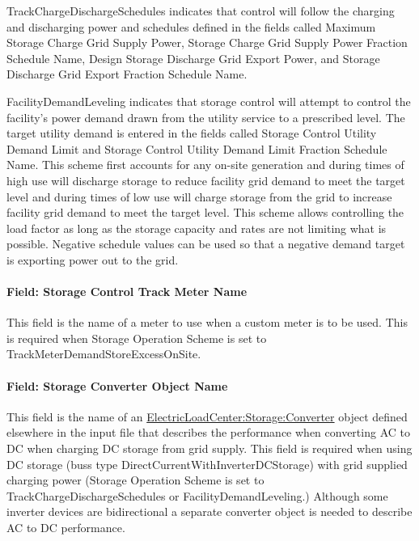 TrackChargeDischargeSchedules indicates that control will follow the charging and discharging power and schedules defined in the fields called Maximum Storage Charge Grid Supply Power, Storage Charge Grid Supply Power Fraction Schedule Name, Design Storage Discharge Grid Export Power, and Storage Discharge Grid Export Fraction Schedule Name.

FacilityDemandLeveling indicates that storage control will attempt to control the facility's power demand drawn from the utility service to a prescribed level. The target utility demand is entered in the fields called Storage Control Utility Demand Limit and Storage Control Utility Demand Limit Fraction Schedule Name. This scheme first accounts for any on-site generation and during times of high use will discharge storage to reduce facility grid demand to meet the target level and during times of low use will charge storage from the grid to increase facility grid demand to meet the target level. This scheme allows controlling the load factor as long as the storage capacity and rates are not limiting what is possible. Negative schedule values can be used so that a negative demand target is exporting power out to the grid.

\paragraph{Field: Storage Control Track Meter Name}\label{field-storage-control-track-meter-name}

This field is the name of a meter to use when a custom meter is to be used. This is required when Storage Operation Scheme is set to TrackMeterDemandStoreExcessOnSite.

\paragraph{Field: Storage Converter Object Name}\label{field-storage-converter-object-name}

This field is the name of an \hyperref[electricloadcenterstorageconverter]{ElectricLoadCenter:Storage:Converter} object defined elsewhere in the input file that describes the performance when converting AC to DC when charging DC storage from grid supply. This field is required when using DC storage (buss type DirectCurrentWithInverterDCStorage) with grid supplied charging power (Storage Operation Scheme is set to TrackChargeDischargeSchedules or FacilityDemandLeveling.) Although some inverter devices are bidirectional a separate converter object is needed to describe AC to DC performance.

